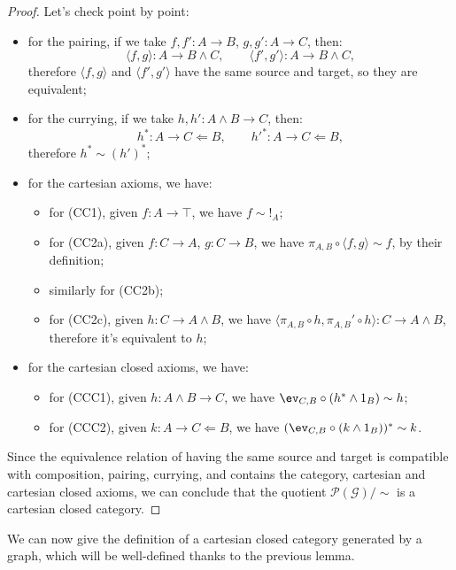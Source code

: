 \begin{proof}
    Let's check point by point:
    \begin{itemize}
        \item for the pairing, if we take $f,f' : A \to B$, $g,g' : A \to C$, then:
        \[ \langle f,g\rangle : A \to B \land C, \qquad \langle f',g'\rangle : A \to B \land C, \]
        therefore $\langle f,g\rangle$ and $\langle f',g'\rangle$ have the same source and target, so they are equivalent;
        \item for the currying, if we take $h,h' : A \land B \to C$, then:
        \[ h^* : A \to C \Leftarrow B, \qquad h'^* : A \to C \Leftarrow B, \]
        therefore $h^* \sim (h')^*$;
        \item for the cartesian axioms, we have:
        \begin{itemize}[label=$\ast$]
            \item for (CC1), given $f : A \to \top$, we have $f \sim !_A$;
            \item for (CC2a), given $f : C \to A$, $g : C \to B$, we have $\pi_{A,B} \circ \langle f,g\rangle \sim f$, by their definition;
            \item similarly for (CC2b);
            \item for (CC2c), given $h : C \to A \land B$, we have $\langle \pi_{A,B} \circ h, \pi_{A,B}' \circ h\rangle : C \to A \land B$, therefore it's equivalent to $h$;
        \end{itemize}
        \item for the cartesian closed axioms, we have:
        \begin{itemize}[label=$\ast$]
            \item for (CCC1), given $h : A \land B \to C$, we have $\ev_{C,B} \circ (h^* \wedge 1_B) \sim h$;
            \item for (CCC2), given $k : A \to C \Leftarrow B$, we have $(\ev_{C,B} \circ (k \wedge 1_B))^* \sim k$.
        \end{itemize}
    \end{itemize}
    Since the equivalence relation of having the same source and target is compatible with composition, pairing, currying, and contains the category, cartesian and cartesian closed axioms, we can conclude that the quotient $\mathcal P(\mathcal G)/{\sim}$ is a cartesian closed category.
\end{proof}

We can now give the definition of a cartesian closed category generated by a graph, which will be well-defined thanks to the previous lemma.

